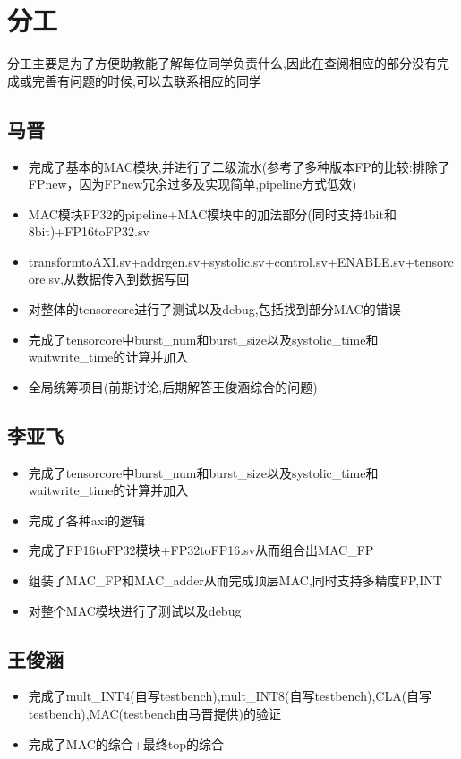 \documentclass[zihao=-4, UTF8]{ctexart}
\begin{document}
\section{分工}
分工主要是为了方便助教能了解每位同学负责什么,因此在查阅相应的部分没有完成或完善有问题的时候,可以去联系相应的同学
\subsection{马晋}
\begin{itemize}
  \item 完成了基本的MAC模块,并进行了二级流水(参考了多种版本FP的比较:排除了FPnew，因为FPnew冗余过多及实现简单,pipeline方式低效)
  \item MAC模块FP32的pipeline+MAC模块中的加法部分(同时支持4bit和8bit)+FP16toFP32.sv
  \item transformtoAXI.sv+addrgen.sv+systolic.sv+control.sv+ENABLE.sv+tensorcore.sv,从数据传入到数据写回
  \item 对整体的tensorcore进行了测试以及debug,包括找到部分MAC的错误
  \item 完成了tensorcore中burst\_num和burst\_size以及systolic\_time和waitwrite\_time的计算并加入
  \item 全局统筹项目(前期讨论,后期解答王俊涵综合的问题)
\end{itemize}
\subsection{李亚飞}
\begin{itemize}
    \item 完成了tensorcore中burst\_num和burst\_size以及systolic\_time和waitwrite\_time的计算并加入
    \item 完成了各种axi的逻辑
    \item 完成了FP16toFP32模块+FP32toFP16.sv从而组合出MAC\_FP
    \item 组装了MAC\_FP和MAC\_adder从而完成顶层MAC,同时支持多精度FP,INT
    \item 对整个MAC模块进行了测试以及debug
\end{itemize}
\subsection{王俊涵}
\begin{itemize}
    \item 完成了mult\_INT4(自写testbench),mult\_INT8(自写testbench),CLA(自写testbench),MAC(testbench由马晋提供)的验证
    \item 完成了MAC的综合+最终top的综合
\end{itemize}
\end{document}
